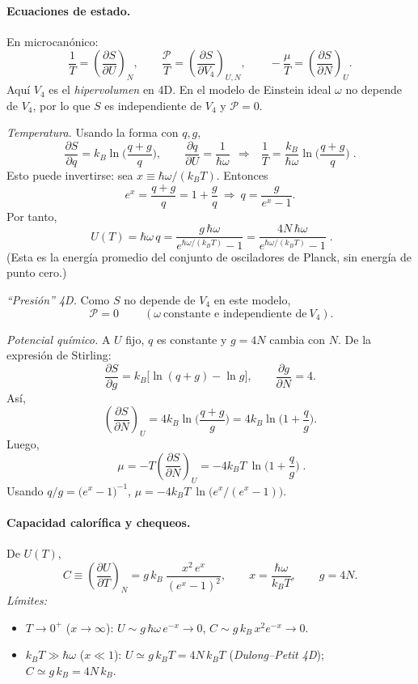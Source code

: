 \documentclass{article}
\begin{document}
\begin{enumerate}[label={{\textcolor{trueblue}{\textbf{Ej}. \arabic*.0}}}, start=3]
\paragraph{Ecuaciones de estado.}
En microcanónico:
\[
\frac{1}{T}=\left(\frac{\partial S}{\partial U}\right)_{N},\qquad
\frac{\mathcal{P}}{T}=\left(\frac{\partial S}{\partial V_4}\right)_{U,N},\qquad
-\frac{\mu}{T}=\left(\frac{\partial S}{\partial N}\right)_{U}.
\]
Aquí \(V_4\) es el \emph{hipervolumen} en 4D. En el modelo de Einstein ideal \(\omega\) no depende de \(V_4\), por lo que \(S\) es independiente de \(V_4\) y \(\mathcal{P}=0\).

\smallskip
\emph{Temperatura.} Usando la forma con \(q,g\),
\[
\frac{\partial S}{\partial q}=k_B\ln\!\Big(\frac{q+g}{q}\Big),
\qquad
\frac{\partial q}{\partial U}=\frac{1}{\hbar\omega}
\ \ \Rightarrow\ \
\boxed{\;
\frac{1}{T}=\frac{k_B}{\hbar\omega}\ln\!\Big(\frac{q+g}{q}\Big)
\;}.
\]
Esto puede invertirse: sea \(x\equiv \hbar\omega/(k_BT)\).
Entonces
\[
e^{x}=\frac{q+g}{q}=1+\frac{g}{q}
\ \Rightarrow\ 
q=\frac{g}{e^{x}-1}.
\]
Por tanto,
\[
\boxed{\;
U(T)=\hbar\omega\,q
=\frac{g\,\hbar\omega}{e^{\hbar\omega/(k_BT)}-1}
=\frac{4N\,\hbar\omega}{e^{\hbar\omega/(k_BT)}-1}
\;}.
\]
(Esta es la energía promedio del conjunto de osciladores de Planck, sin energía de punto cero.)

\smallskip
\emph{“Presión” 4D.} Como \(S\) no depende de \(V_4\) en este modelo,
\[
\boxed{\ \mathcal{P}=0\ } \qquad (\omega\ \text{constante e independiente de}\ V_4).
\]

\smallskip
\emph{Potencial químico.} A \(U\) fijo, \(q\) es constante y \(g=4N\) cambia con \(N\).
De la expresión de Stirling:
\[
\frac{\partial S}{\partial g}=k_B\Big[\ln(q+g)-\ln g\Big],\qquad \frac{\partial g}{\partial N}=4.
\]
Así,
\[
\left(\frac{\partial S}{\partial N}\right)_{U}
=4k_B\ln\!\Big(\frac{q+g}{g}\Big)
=4k_B\ln\!\Big(1+\frac{q}{g}\Big).
\]
Luego,
\[
\boxed{\;
\mu=-T\left(\frac{\partial S}{\partial N}\right)_{U}
=-4k_B T\ \ln\!\Big(1+\frac{q}{g}\Big)
\;}.
\]
Usando \(q/g=\big(e^{x}-1\big)^{-1}\),
\(
\mu=-4k_B T\ \ln\!\big(e^{x}/(e^{x}-1)\big)
\).

\paragraph{Capacidad calorífica y chequeos.}
De \(U(T)\),
\[
C\equiv\left(\frac{\partial U}{\partial T}\right)_{N}
=g\,k_B\ \frac{x^2\,e^{x}}{(e^{x}-1)^2},
\qquad x=\frac{\hbar\omega}{k_BT},
\qquad g=4N.
\]
\textit{Límites:}
\begin{itemize}
\item \(T\to 0^{+}\) (\(x\to\infty\)): \(U\sim g\,\hbar\omega\,e^{-x}\to 0\), \(C\sim g\,k_B\,x^2 e^{-x}\to 0\).
\item \(k_BT\gg\hbar\omega\) (\(x\ll 1\)): \(U\simeq g\,k_B T=4N\,k_B T\) (\textit{Dulong–Petit 4D}); \(C\simeq g\,k_B=4N\,k_B\).
\end{itemize}


\end{enumerate}
\end{document}
